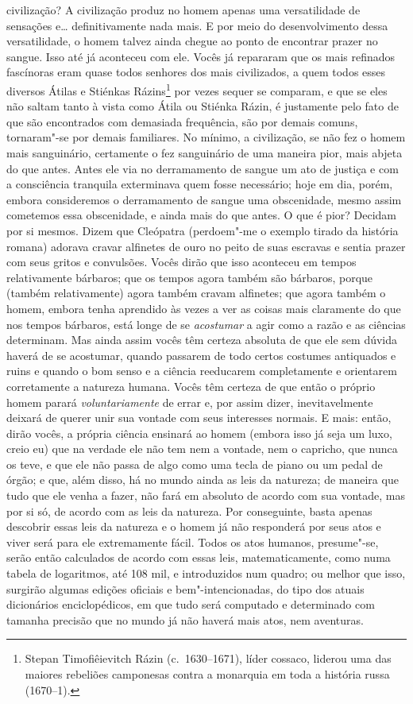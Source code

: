 civilização? A civilização produz no homem apenas uma versatilidade de
sensações e\ldots{} definitivamente nada mais. E por meio do desenvolvimento
dessa versatilidade, o homem talvez ainda chegue ao ponto de encontrar prazer
no sangue. Isso até já aconteceu com ele. Vocês já repararam que os mais
refinados fascínoras eram quase todos senhores dos mais civilizados, a quem
todos esses diversos Átilas e Stiénkas Rázins\footnote{ Stepan Timofiêievitch
Rázin (c.~1630--1671), líder cossaco, liderou uma das maiores rebeliões
camponesas contra a monarquia em toda a história russa (1670--1).} por vezes
sequer se comparam, e que se eles não saltam tanto à vista como Átila ou
Stiénka Rázin, é justamente pelo fato de que são encontrados com demasiada
frequência, são por demais comuns, tornaram"-se por demais familiares.  No
mínimo, a civilização, se não fez o homem mais sanguinário, certamente o fez
sanguinário de uma maneira pior, mais abjeta do que antes. Antes ele via no
derramamento de sangue um ato de justiça e com a consciência tranquila
exterminava quem fosse necessário; hoje em dia, porém, embora consideremos o
derramamento de sangue uma obscenidade, mesmo assim cometemos essa obscenidade,
e ainda mais do que antes. O que é pior? Decidam por si mesmos. Dizem que
Cleópatra (perdoem"-me o exemplo tirado da história romana) adorava cravar
alfinetes de ouro no peito de suas escravas e sentia prazer com seus gritos e
convulsões.  Vocês dirão que isso aconteceu em tempos relativamente bárbaros;
que os tempos agora também são bárbaros, porque (também relativamente) agora
também cravam alfinetes; que agora também o homem, embora tenha aprendido às
vezes a ver as coisas mais claramente do que nos tempos bárbaros, está
longe de se \textit{acostumar} a agir como a razão e as ciências determinam.
Mas ainda assim vocês têm certeza absoluta de que ele sem dúvida haverá de se
acostumar, quando passarem de todo certos costumes antiquados e ruins e quando
o bom senso e a ciência reeducarem completamente e orientarem corretamente a
natureza humana.  Vocês têm certeza de que então o próprio homem parará
\textit{voluntariamente} de errar e, por assim dizer, inevitavelmente deixará
de querer unir sua vontade com seus interesses normais. E mais: então, dirão
vocês, a própria ciência ensinará ao homem (embora isso já seja um luxo, creio
eu) que na verdade ele não tem nem a vontade, nem o capricho, que nunca os
teve, e que ele não passa de algo como uma tecla de piano ou um pedal de órgão;
e que, além disso, há no mundo ainda as leis da natureza; de maneira que tudo
que ele venha a fazer, não fará em absoluto de acordo com sua vontade, mas por
si só, de acordo com as leis da natureza. Por conseguinte, basta apenas
descobrir essas leis da natureza e o homem já não responderá por seus atos e
viver será para ele extremamente fácil. Todos os atos humanos, presume"-se,
serão então calculados de acordo com essas leis, matematicamente, como numa
tabela de logaritmos, até 108 mil, e introduzidos num quadro; ou melhor que
isso, surgirão algumas edições oficiais e bem"-intencionadas, do tipo dos atuais
dicionários enciclopédicos, em que tudo será computado e determinado com
tamanha precisão que no mundo já não haverá mais atos, nem aventuras.


